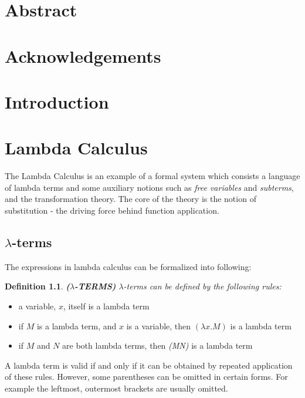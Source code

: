 \documentclass[a4paper,11pt,twoside]{report}
\newtheorem{def1}{\textbf{Definition}}[chapter]
\begin{document}
\tableofcontents



\chapter*{Abstract}

\chapter*{Acknowledgements}
\chapter*{Introduction}


\chapter{Lambda Calculus}
The Lambda Calculus is an example of a formal system which consists a language of lambda terms and some auxiliary notions such as \textit{free variables} and \textit{subterms}, and the transformation theory. The core of the theory is the notion of substitution - the driving force behind function application. 


\section{$\lambda$-terms}

\noindent The expressions in lambda calculus can be formalized into following: 


\begin{def1}
\normalfont \textbf{($\lambda$-TERMS)} $\lambda$-terms can be defined by the following rules:
\end{def1}

\begin{itemize}
\item a variable, $x$, itself is a lambda term
\item if $M$ is a lambda term, and $x$ is a variable, then $(\lambda x.M)$ is a lambda term
\item if $M$ and $N$ are both lambda terms, then \textit{(MN)} is a lambda term
\end{itemize}
A lambda term is valid if and only if it can be obtained by repeated application of these rules. However, some parentheses can be omitted in certain forms. For example the leftmost, outermost brackets are usually omitted.
\end{document}
